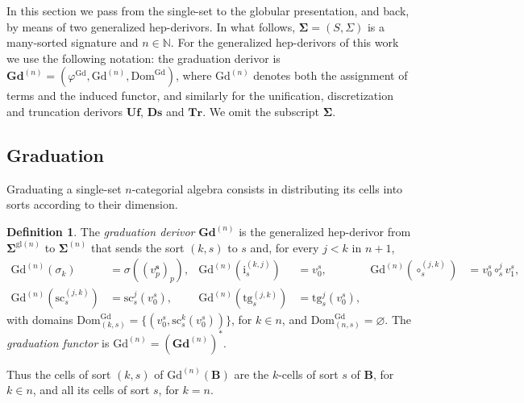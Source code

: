 \documentclass[a4paper,reqno]{amsart}
\newcommand{\sig}[1]{\mathbf{#1}}                %
\newcommand{\Dom}{\mathrm{Dom}}
\newcommand{\gl}{\mathrm{gl}}
\newcommand{\src}{\mathrm{sc}}
\newcommand{\tgt}{\mathrm{tg}}
\newcommand{\ii}{\mathrm{i}}
\newcommand{\Gd}{\mathrm{Gd}}
\newcommand{\bGd}{\mathbf{Gd}}
\newcommand{\bUf}{\mathbf{Uf}}
\newcommand{\bDs}{\mathbf{Ds}}
\newcommand{\bTr}{\mathbf{Tr}}
\theoremstyle{plain}
\theoremstyle{definition}
\newtheorem{definition}[theorem]{Definition}
\begin{document}
In this section we pass from the single-set to the globular presentation, and back, by means of two generalized hep-derivors.
In what follows, $\sig{\Sigma}=(S,\Sigma)$ is a many-sorted signature and $n\in\mathbb{N}$.
For the generalized hep-derivors of this work we use the following notation: the graduation derivor is $\bGd^{(n)}=(\varphi^{\Gd},\Gd^{(n)},\Dom^{\Gd})$, where $\Gd^{(n)}$ denotes both the assignment of terms and the induced functor, and similarly for the unification, discretization and truncation derivors $\bUf$, $\bDs$ and $\bTr$.
We omit the subscript $\sig{\Sigma}$.

\subsection{Graduation}

Graduating a single-set $n$-categorial algebra consists in distributing its cells into sorts according to their dimension.

\begin{definition}\label{DGradDerivor}
The \emph{graduation derivor} $\bGd^{(n)}$ is the generalized hep-derivor from $\sig{\Sigma}^{\gl(n)}$ to $\sig{\Sigma}^{(n)}$ that sends the sort $(k,s)$ to $s$ and, for every $j<k$ in $n+1$,
\begin{align*}
\Gd^{(n)}(\sigma_{k})&=\sigma((v^{\mathbf{s}}_{p})_{p}), &
\Gd^{(n)}(\ii^{(k,j)}_{s})&=v^{s}_{0}, &
\Gd^{(n)}(\circ^{(j,k)}_{s})&=v^{s}_{0}\circ^{j}_{s}v^{s}_{1},\\
\Gd^{(n)}(\src^{(j,k)}_{s})&=\src^{j}_{s}(v^{s}_{0}), &
\Gd^{(n)}(\tgt^{(j,k)}_{s})&=\tgt^{j}_{s}(v^{s}_{0}),
\end{align*}
with domains $\Dom^{\Gd}_{(k,s)}=\{(v^{s}_{0},\src^{k}_{s}(v^{s}_{0}))\}$, for $k\in n$, and $\Dom^{\Gd}_{(n,s)}=\varnothing$.
The \emph{graduation functor} is $\Gd^{(n)}=(\bGd^{(n)})^{\ast}$.
\end{definition}

Thus the cells of sort $(k,s)$ of $\Gd^{(n)}(\mathbf{B})$ are the $k$-cells of sort $s$ of $\mathbf{B}$, for $k\in n$, and all its cells of sort $s$, for $k=n$.
\end{document}
